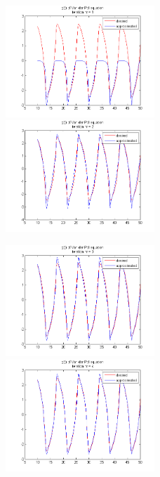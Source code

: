 \begin{figure}[ht!]
	\centering

	\subfloat
	{\includegraphics[width=0.5\textwidth]
	{images/signal_iter1.png}}
	\subfloat
	{\includegraphics[width=0.5\textwidth]
	{images/signal_iter2.png}}
	
	\subfloat
	{\includegraphics[width=0.5\textwidth]
	{images/signal_iter3.png}}
	\subfloat
	{\includegraphics[width=0.5\textwidth]
	{images/signal_iter4.png}}


\end{figure}
